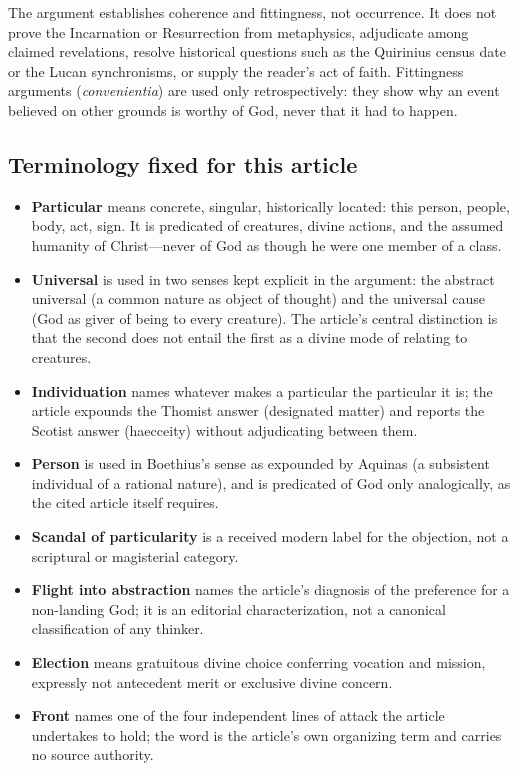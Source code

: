 The argument establishes coherence and fittingness, not occurrence. It does not prove the Incarnation or Resurrection from metaphysics, adjudicate among claimed revelations, resolve historical questions such as the Quirinius census date or the Lucan synchronisms, or supply the reader's act of faith. Fittingness arguments (\emph{convenientia}) are used only retrospectively: they show why an event believed on other grounds is worthy of God, never that it had to happen.

\subsection{Terminology fixed for this article}

\begin{itemize}
\item \textbf{Particular} means concrete, singular, historically located: this person, people, body, act, sign. It is predicated of creatures, divine actions, and the assumed humanity of Christ---never of God as though he were one member of a class.
\item \textbf{Universal} is used in two senses kept explicit in the argument: the abstract universal (a common nature as object of thought) and the universal cause (God as giver of being to every creature). The article's central distinction is that the second does not entail the first as a divine mode of relating to creatures.
\item \textbf{Individuation} names whatever makes a particular the particular it is; the article expounds the Thomist answer (designated matter) and reports the Scotist answer (haecceity) without adjudicating between them.
\item \textbf{Person} is used in Boethius's sense as expounded by Aquinas (a subsistent individual of a rational nature), and is predicated of God only analogically, as the cited article itself requires.
\item \textbf{Scandal of particularity} is a received modern label for the objection, not a scriptural or magisterial category.
\item \textbf{Flight into abstraction} names the article's diagnosis of the preference for a non-landing God; it is an editorial characterization, not a canonical classification of any thinker.
\item \textbf{Election} means gratuitous divine choice conferring vocation and mission, expressly not antecedent merit or exclusive divine concern.
\item \textbf{Front} names one of the four independent lines of attack the article undertakes to hold; the word is the article's own organizing term and carries no source authority.

\end{itemize}
